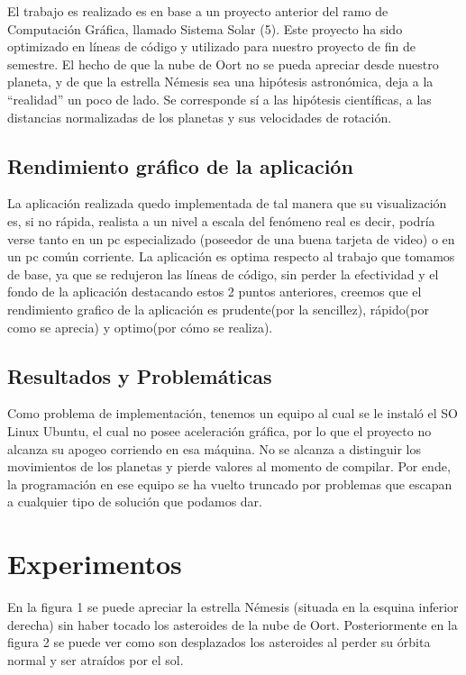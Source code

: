 \documentclass[journal]{IEEEtran}
\begin{document}
 El trabajo es realizado es en base a un proyecto anterior del ramo de Computación Gráfica, llamado Sistema Solar (5). Este proyecto ha sido optimizado en líneas de código y utilizado para nuestro proyecto de fin de semestre. El hecho de que la nube de Oort no se pueda apreciar desde nuestro planeta, y de que la estrella Némesis sea una hipótesis astronómica, deja a la “realidad” un poco de lado. Se corresponde sí a las hipótesis científicas, a las distancias normalizadas de los planetas y sus velocidades de rotación.

\subsection{Rendimiento gráfico de la aplicación}

La aplicación realizada quedo implementada de tal manera que su visualización es, si no rápida, realista a un nivel a escala del fenómeno real es decir, podría verse tanto en un pc especializado (poseedor de una buena tarjeta de video) o en un pc común  corriente. La aplicación es optima respecto al trabajo que tomamos de base, ya que se redujeron las líneas de código, sin perder la efectividad y el fondo de la aplicación destacando estos 2 puntos anteriores, creemos que el rendimiento grafico de la aplicación es prudente(por la sencillez), rápido(por como se aprecia) y optimo(por cómo se realiza).

\subsection{Resultados y Problemáticas}

Como problema de implementación, tenemos un equipo al cual se le instaló el SO Linux Ubuntu, el cual no posee aceleración gráfica, por lo que el proyecto no alcanza su apogeo corriendo en esa máquina. No se alcanza a distinguir los movimientos de los planetas y pierde valores al momento de compilar. Por ende, la programación en ese equipo se ha vuelto truncado por problemas que escapan a cualquier tipo de solución que podamos dar. 

\section{Experimentos}

En la figura 1 se puede apreciar la estrella Némesis (situada en la esquina inferior derecha) sin haber tocado los asteroides de la nube de Oort. Posteriormente en la figura 2 se puede ver como son desplazados los asteroides al perder su órbita normal y ser atraídos por el sol.
\end{document}
